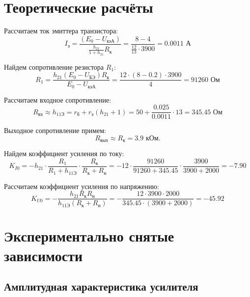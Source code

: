 \section{Теоретические расчёты}

Рассчитаем ток эмиттера транзистора: 
\begin{displaymath}
I_\text{э} = \frac{(E_0 - U_\text{кэА})}{\frac{h_{21}}{1+h_{21}}R_\text{к}} = \frac{8 - 4}{\frac{12}{13} \cdot 3900} = 0.0011 \text{ А}
\end{displaymath}

Найдем сопротивление резистора $R_1$:
\begin{displaymath}
R_1 = \frac{h_{21}(E_0-U_\text{БЭ})R_\text{к}}{E_0-U_\text{кэА}} = \frac{12 \cdot (8 - 0.2) \cdot 3900}{4} = 91260 \text{ Ом}
\end{displaymath}

Рассчитаем входное сопротивление:
\begin{equation}
R_\text{вх} \approx h_\text{11Э} = r_\text{б} + r_\text{э}(h_{21} + 1) = 50 + \frac{0.025}{0.0011} \cdot 13 = 345.45 \text{ Ом}
\end{equation}

Выходное сопротивление примем:
\begin{equation}
R_\text{вых} \approx R_\text{к} = 3.9 \text{ кОм}.
\end{equation}

Найдем коэффициент усиления по току:
\begin{equation}
K_{I0} %
= - h_{21} \cdot \frac{R_1}{R_1 + h_\text{11Э}} \cdot \frac{R_\text{к}}{R_\text{к}+R_\text{н}} %
= - 12 \cdot \frac{91260}{91260 + 345.45} \cdot \frac{3900}{3900+2000} %
= - 7.90
\end{equation}

Рассчитаем коэффициент усиления по напряжению:
\begin{equation}
K_{U0} %
= -\frac{h_{21} R_\text{к} R_\text{н}}{h_\text{11Э}(R_\text{к} + R_\text{н})} %
= -\frac{12 \cdot 3900 \cdot 2000}{345.45 \cdot (3900 + 2000)} %
= -45.92
\end{equation}

\newpage

\section{Экспериментально снятые зависимости}

\subsection{Амплитудная характеристика усилителя}

